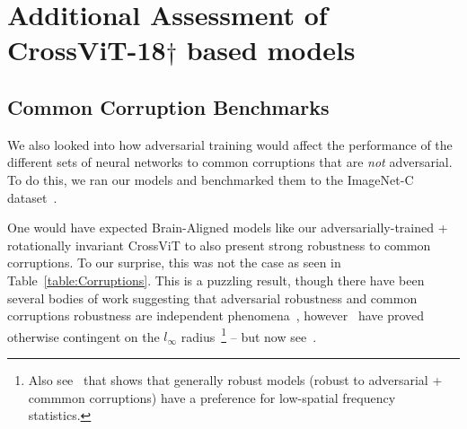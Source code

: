 \documentclass{article} %
\newcommand{\arturo}{\textcolor{violet}}
\begin{document}
\section{Additional Assessment of CrossViT-18$\dagger$ based models}
\label{additional-experiments}
\subsection{Common Corruption Benchmarks}
We also looked into how adversarial training would affect the performance of the different sets of neural networks to common corruptions that are \textit{not} adversarial. To do this, we ran our models and benchmarked them to the ImageNet-C dataset~\citep{hendrycks2018benchmarking}.

One would have expected Brain-Aligned models like our adversarially-trained + rotationally invariant CrossViT to also present strong robustness to common corruptions. To our surprise, this was not the case as seen in Table~\ref{table:Corruptions}. This is a puzzling result, though there have been several bodies of work suggesting that adversarial robustness and common corruptions robustness are independent phenomena~\citep{laugros2019adversarial}, however~\cite{kireev2021effectiveness} have proved otherwise contingent on the $l_\infty$ radius~\footnote{Also see~\cite{li2022robust} that shows that generally robust models (robust to adversarial + commmon corruptions) have a preference for low-spatial frequency statistics.} -- but now see~\cite{li2022robust}.
\end{document}
